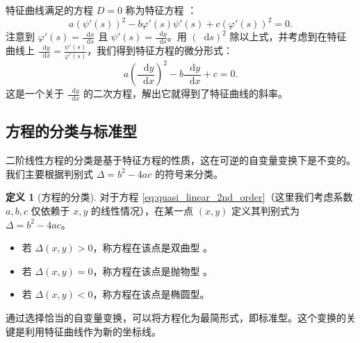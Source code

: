 \documentclass[a4paper, 12pt, oneside]{article} %
\newcommand{\diff}{\mathop{}\!\mathrm{d}}
\numberwithin{subsection}{section}
\numberwithin{subsubsection}{subsection}
\theoremstyle{plain}
\theoremstyle{definition}
\newtheorem{definition}[theorem]{定义}
\theoremstyle{remark}
\begin{document}
		特征曲线满足的方程 \(D=0\) 称为特征方程 ：
		\begin{equation}\label{eq:characteristic_eq_parametric}
			a(\psi'(s))^2 - b\varphi'(s)\psi'(s) + c(\varphi'(s))^2 = 0.
		\end{equation}
		注意到 \(\varphi'(s) = \frac{\diff x}{\diff s}\) 且 \(\psi'(s) = \frac{\diff y}{\diff s}\)。用 \((\diff s)^2\) 除以上式，并考虑到在特征曲线上 \(\frac{\diff y}{\diff x} = \frac{\psi'(s)}{\varphi'(s)}\)，我们得到特征方程的微分形式：
		\begin{equation}\label{eq:characteristic_ode}
			a \left(\frac{\diff y}{\diff x}\right)^2 - b \frac{\diff y}{\diff x} + c = 0.
		\end{equation}
		这是一个关于 \(\frac{\diff y}{\diff x}\) 的二次方程，解出它就得到了特征曲线的斜率。
		
		
		\subsection{方程的分类与标准型}
		二阶线性方程的分类是基于特征方程的性质，这在可逆的自变量变换下是不变的。我们主要根据判别式 \(\Delta = b^2 - 4ac\) 的符号来分类。
		\begin{definition}[方程的分类]
			对于方程 \eqref{eq:quasi_linear_2nd_order}（这里我们考虑系数 \(a,b,c\) 仅依赖于 \(x,y\) 的线性情况），在某一点 \((x,y)\) 定义其判别式为 \(\Delta = b^2 - 4ac\)。
			\begin{itemize}
				\item 若 \(\Delta(x,y) > 0\)，称方程在该点是双曲型 。
				\item 若 \(\Delta(x,y) = 0\)，称方程在该点是抛物型 。
				\item 若 \(\Delta(x,y) < 0\)，称方程在该点是椭圆型。
			\end{itemize}
		\end{definition}
		通过选择恰当的自变量变换，可以将方程化为最简形式，即标准型。这个变换的关键是利用特征曲线作为新的坐标线。
		
\end{document}
